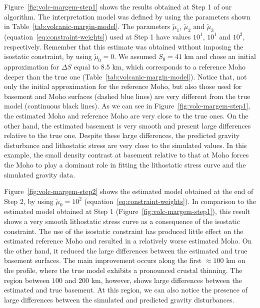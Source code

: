 \documentclass[manuscript]{geophysics}
\begin{document}
Figure~\ref{fig:volc-margem-step1} shows the results obtained at Step 1 of our
algorithm.
The interpretation model was defined by using the parameters shown in
Table~\ref{tab:volcanic-margin-model}.
The parameters $\tilde{\mu}_{1}$, $\tilde{\mu}_{2}$ and 
$\tilde{\mu}_{3}$ (equation~\ref{eq:constraint-weights}) used at Step 1 
have values $10^{1}$, $10^{1}$ and $10^{2}$, respectively.
Remember that this estimate was obtained without imposing the 
isostatic constraint, by using $\tilde{\mu}_{0} = 0$.
We assumed $S_{0} = 41$ km and chose an initial approximation for $\Delta S$
equal to $8.5$ km, which corresponds to a reference Moho deeper 
than the true one (Table~\ref{tab:volcanic-margin-model}).
Notice that, not only the initial approximation for the reference Moho,
but also those used for basement and Moho surfaces 
(dashed blue lines) are very different from
the true model (continuous black lines).
As we can see in Figure~\ref{fig:volc-margem-step1}, the estimated Moho and reference 
Moho are very close to the true ones.
On the other hand, the estimated basement is very smooth and present large differences
relative to the true one.
Despite these large differences, 
the predicted gravity disturbance and lithostatic stress 
are very close to the simulated values.
In this example, the small density contrast at basement relative to that at Moho
forces the Moho to play a dominant role in fitting the
lithostatic stress curve and the simulated gravity data.

Figure~\ref{fig:volc-margem-step2} shows the estimated model obtained at the end
of Step 2, by using $\tilde{\mu}_{0} = 10^{2}$ (equation~\ref{eq:constraint-weights}).
In comparison to the estimated model obtained at Step 1 (Figure~\ref{fig:volc-margem-step1}),
this result shows a very smooth lithostatic stress curve as a consequence of the
isostatic constraint. The use of the isostatic constraint has produced little effect on the
estimated reference Moho and resulted in a relatively worse estimated Moho.
On the other hand, it reduced the large differences between the estimated and 
true basement surfaces. The main improvement occurs along the 
first $\approx 100$ km on the profile, where the true model exhibits a pronounced crustal
thinning. The region between $100$ and $200$ km, however, shows large 
differences between the estimated and true basement. At this region, we can also
notice the presence of large differences between the simulated and predicted gravity
disturbances.
\end{document}

